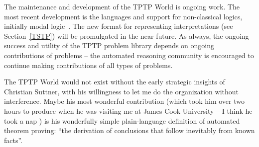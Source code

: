 \documentclass[runningheads]{llncs}
\begin{document}
The maintenance and development of the TPTP World is ongoing work.
The most recent development is the languages and support for non-classical logics, initially
modal logic~\cite{SF+22,SS24}.
The new format for representing interpretations (see Section~\ref{TSTP}) will be promulgated in 
the near future.
As always, the ongoing success and utility of the TPTP problem library depends on ongoing 
contributions of problems -- the automated reasoning community is encouraged to continue making 
contributions of all types of problems.

The TPTP World would not exist without the early strategic insights of Christian Suttner,
with his willingness to let me do the organization without interference. 
Maybe his most wonderful contribution (which took him over two hours to produce when he
was visiting me at James Cook University -- I think he took a nap \smiley) is his 
wonderfully simple plain-language definition of automated theorem proving: 
``the derivation of conclusions that follow inevitably from known facts''.



\end{document}
